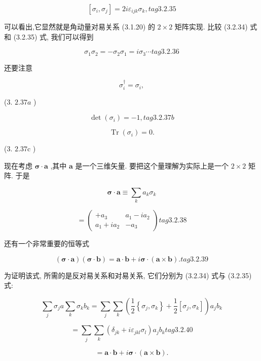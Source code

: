 $$
\left\lbrack {{\sigma }_{i},{\sigma }_{j}}\right\rbrack = {2i}{\varepsilon }_{ijk}{\sigma }_{k}, tag{3. 2.35}
$$

可以看出,它显然就是角动量对易关系 (3.1.20) 的 $2 \times 2$ 矩阵实现. 比较 (3.2.34) 式和 (3.2.35) 式, 我们可以得到

$$
{\sigma }_{1}{\sigma }_{2} = - {\sigma }_{2}{\sigma }_{1} = i{\sigma }_{3}\cdots tag{3. 2.36}
$$

还要注意

$$
{\sigma }_{i}^{ \dagger } = {\sigma }_{i},
$$

(3. ${2.37a}$ )

$$
\det \left( {\sigma }_{i}\right) = - 1, tag{3. 2.37b}
$$

$$
\operatorname{Tr}\left( {\sigma }_{i}\right) = 0.
$$

(3. ${2.37}\mathrm{c}$ )

现在考虑 $\mathbf{\sigma } \cdot \mathbf{a}$ ,其中 $\mathbf{a}$ 是一个三维矢量. 要把这个量理解为实际上是一个 $2 \times 2$ 矩阵. 于是

$$
\mathbf{\sigma } \cdot \mathbf{a} \equiv \mathop{\sum }\limits_{k}{a}_{k}{\sigma }_{k}
$$

$$
= \left( \begin{matrix} + {a}_{3} & {a}_{1} - i{a}_{2} \\ {a}_{1} + i{a}_{2} & - {a}_{3} \end{matrix}\right) tag{3. 2.38}
$$

还有一个非常重要的恒等式

$$
\left( {\mathbf{\sigma } \cdot \mathbf{a}}\right) \left( {\mathbf{\sigma } \cdot \mathbf{b}}\right) = \mathbf{a} \cdot \mathbf{b} + i\mathbf{\sigma } \cdot \left( {\mathbf{a} \times \mathbf{b}}\right) . tag{3. 2.39}
$$

为证明该式, 所需的是反对易关系和对易关系, 它们分别为 (3.2.34) 式与 (3.2.35) 式:

$$
\mathop{\sum }\limits_{j}{\sigma }_{j}a\mathop{\sum }\limits_{k}{\sigma }_{k}{b}_{k} = \mathop{\sum }\limits_{j}\mathop{\sum }\limits_{k}\left( {\frac{1}{2}\left\{ {{\sigma }_{j},{\sigma }_{k}}\right\} + \frac{1}{2}\left\lbrack {{\sigma }_{j},{\sigma }_{k}}\right\rbrack }\right) {a}_{j}{b}_{k}
$$

$$
= \mathop{\sum }\limits_{j}\mathop{\sum }\limits_{k}\left( {{\delta }_{jk} + i{\varepsilon }_{jkl}{\sigma }_{l}}\right) {a}_{j}{b}_{k} tag{3. 2.40}
$$

$$
= \mathbf{a} \cdot \mathbf{b} + i\mathbf{\sigma } \cdot \left( {\mathbf{a} \times \mathbf{b}}\right) .
$$

